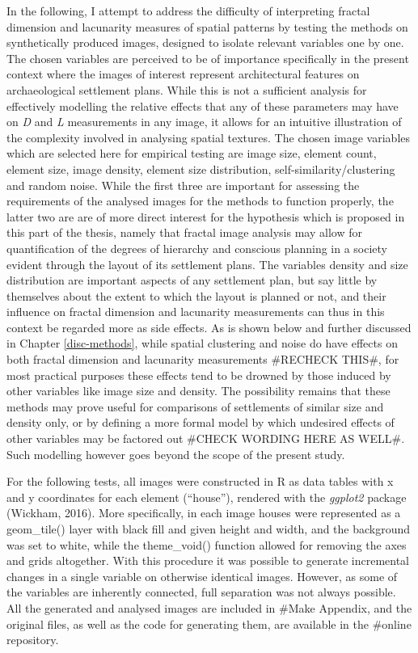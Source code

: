 \documentclass[
  12pt,
]{book}
\begin{document}
In the following, I attempt to address the difficulty of interpreting fractal dimension and lacunarity measures of spatial patterns by testing the methods on synthetically produced images, designed to isolate relevant variables one by one. The chosen variables are perceived to be of importance specifically in the present context where the images of interest represent architectural features on archaeological settlement plans. While this is not a sufficient analysis for effectively modelling the relative effects that any of these parameters may have on \emph{D} and \emph{L} measurements in any image, it allows for an intuitive illustration of the complexity involved in analysing spatial textures. The chosen image variables which are selected here for empirical testing are image size, element count, element size, image density, element size distribution, self-similarity/clustering and random noise. While the first three are important for assessing the requirements of the analysed images for the methods to function properly, the latter two are are of more direct interest for the hypothesis which is proposed in this part of the thesis, namely that fractal image analysis may allow for quantification of the degrees of hierarchy and conscious planning in a society evident through the layout of its settlement plans. The variables density and size distribution are important aspects of any settlement plan, but say little by themselves about the extent to which the layout is planned or not, and their influence on fractal dimension and lacunarity measurements can thus in this context be regarded more as side effects. As is shown below and further discussed in Chapter \ref{disc-methods}, while spatial clustering and noise do have effects on both fractal dimension and lacunarity measurements \#RECHECK THIS\#, for most practical purposes these effects tend to be drowned by those induced by other variables like image size and density. The possibility remains that these methods may prove useful for comparisons of settlements of similar size and density only, or by defining a more formal model by which undesired effects of other variables may be factored out \#CHECK WORDING HERE AS WELL\#. Such modelling however goes beyond the scope of the present study.

For the following tests, all images were constructed in R as data tables with x and y coordinates for each element (``house''), rendered with the \emph{ggplot2} package (Wickham, 2016). More specifically, in each image houses were represented as a geom\_tile() layer with black fill and given height and width, and the background was set to white, while the theme\_void() function allowed for removing the axes and grids altogether. With this procedure it was possible to generate incremental changes in a single variable on otherwise identical images. However, as some of the variables are inherently connected, full separation was not always possible. All the generated and analysed images are included in \#Make Appendix, and the original files, as well as the code for generating them, are available in the \#online repository.
\end{document}
